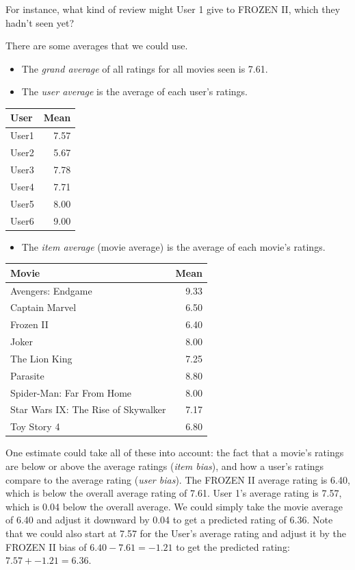 \documentclass[
]{book}
\providecommand{\tightlist}{%
  \setlength{\itemsep}{0pt}\setlength{\parskip}{0pt}}
\theoremstyle{definition}
\theoremstyle{definition}
\theoremstyle{definition}
\theoremstyle{definition}
\theoremstyle{remark}
\begin{document}
\normalsize

For instance, what kind of review might User 1 give to FROZEN II, which they hadn't seen yet?

There are some averages that we could use.

\begin{itemize}
\item
  The \emph{grand average} of all ratings for all movies seen is 7.61.
\item
  The \emph{user average} is the average of each user's ratings.
\end{itemize}

\begin{longtable}{lr}
\toprule
User & Mean\\
\midrule
User1 & 7.57\\
User2 & 5.67\\
User3 & 7.78\\
User4 & 7.71\\
User5 & 8.00\\
User6 & 9.00\\
\bottomrule
\end{longtable}

\begin{itemize}
\tightlist
\item
  The \emph{item average} (movie average) is the average of each movie's ratings.
\end{itemize}

\begin{longtable}{lr}
\toprule
Movie & Mean\\
\midrule
Avengers: Endgame & 9.33\\
Captain Marvel & 6.50\\
Frozen II & 6.40\\
Joker & 8.00\\
The Lion King & 7.25\\
Parasite & 8.80\\
Spider-Man: Far From Home & 8.00\\
Star Wars IX: The Rise of Skywalker & 7.17\\
Toy Story 4 & 6.80\\
\bottomrule
\end{longtable}

One estimate could take all of these into account: the fact that a movie's ratings are below or above the average ratings (\emph{item bias}), and how a user's ratings compare to the average rating (\emph{user bias}). The FROZEN II average rating is 6.40, which is below the overall average rating of 7.61. User 1's average rating is 7.57, which is 0.04 below the overall average. We could simply take the movie average of 6.40 and adjust it downward by 0.04 to get a predicted rating of 6.36. Note that we could also start at 7.57 for the User's average rating and adjust it by the FROZEN II bias of \(6.40-7.61=-1.21\) to get the predicted rating: \(7.57+-1.21=6.36.\)
\end{document}
